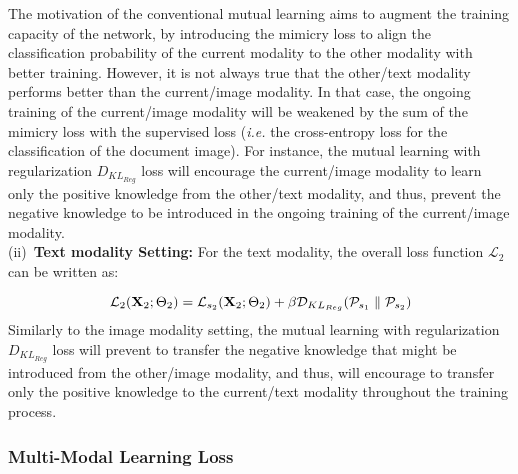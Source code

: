 \documentclass[twocolumn]{svjour3}
\newcommand{\ie}{\textit{i.e. }}
\begin{document}
The motivation of the conventional mutual learning aims to augment the training capacity of the network, by introducing the mimicry loss to align the classification probability of the current modality to the other modality with better training. However, it is not always true that the other/text modality performs better than the current/image modality. In that case, the ongoing training of the current/image modality will be weakened by the sum of the mimicry loss with the supervised loss (\ie the cross-entropy loss for the classification of the document image). For instance, the mutual learning with regularization ${D}_{{KL}_{Reg}}$ loss will encourage the current/image modality to learn only the positive knowledge from the other/text modality, and thus, prevent the negative knowledge to be introduced in the ongoing training of the current/image modality. \\
(ii)\noindent~\textbf{Text modality Setting:}
For the text modality, the overall loss function $\mathcal{L}_2$ can be written as:  

\begin{equation}
\mathcal{L}_2(\mathbf{X}_2;\Theta_2) =
\mathcal{L}_{{s}_{2}}(\mathbf{X}_2;\Theta_2) + \\ \beta\mathcal{D}_{{KL}_{Reg}}(\mathcal{P}_{{s}_{1}}\parallel{\mathcal{P}_{{s}_{2}}})\! 
\label{eq:equation18}
\end{equation} 
Similarly to the image modality setting, the mutual learning with regularization ${D}_{{KL}_{Reg}}$ loss will prevent to transfer the negative knowledge that might be introduced from the other/image modality, and thus, will encourage to transfer only the positive knowledge to the current/text modality throughout the training process.

\subsubsection{Multi-Modal Learning Loss}
\label{sec:multi-modal feature learning}
\end{document}
